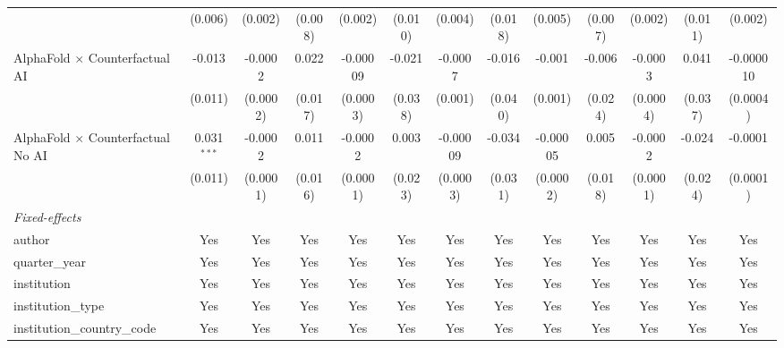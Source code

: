 \begin{tabular}{lcccccccccccc}
                                            & (0.006)       & (0.002)      & (0.008)       & (0.002)      & (0.010) & (0.004)     & (0.018)       & (0.005)     & (0.007)       & (0.002)  & (0.011)       & (0.002)\\   
   AlphaFold $\times$ Counterfactual AI     & -0.013        & -0.0002      & 0.022         & -0.00009     & -0.021  & -0.0007     & -0.016        & -0.001      & -0.006        & -0.0003  & 0.041         & -0.000010\\   
                                            & (0.011)       & (0.0002)     & (0.017)       & (0.0003)     & (0.038) & (0.001)     & (0.040)       & (0.001)     & (0.024)       & (0.0004) & (0.037)       & (0.0004)\\   
   AlphaFold $\times$ Counterfactual No AI  & 0.031$^{***}$ & -0.0002      & 0.011         & -0.0002      & 0.003   & -0.00009    & -0.034        & -0.00005    & 0.005         & -0.0002  & -0.024        & -0.0001\\   
                                            & (0.011)       & (0.0001)     & (0.016)       & (0.0001)     & (0.023) & (0.0003)    & (0.031)       & (0.0002)    & (0.018)       & (0.0001) & (0.024)       & (0.0001)\\   
   \midrule
   \emph{Fixed-effects}\\
   author                                   & Yes           & Yes          & Yes           & Yes          & Yes     & Yes         & Yes           & Yes         & Yes           & Yes      & Yes           & Yes\\  
   quarter\_year                            & Yes           & Yes          & Yes           & Yes          & Yes     & Yes         & Yes           & Yes         & Yes           & Yes      & Yes           & Yes\\  
   institution                              & Yes           & Yes          & Yes           & Yes          & Yes     & Yes         & Yes           & Yes         & Yes           & Yes      & Yes           & Yes\\  
   institution\_type                        & Yes           & Yes          & Yes           & Yes          & Yes     & Yes         & Yes           & Yes         & Yes           & Yes      & Yes           & Yes\\  
   institution\_country\_code               & Yes           & Yes          & Yes           & Yes          & Yes     & Yes         & Yes           & Yes         & Yes           & Yes      & Yes           & Yes\\  

\end{tabular}
